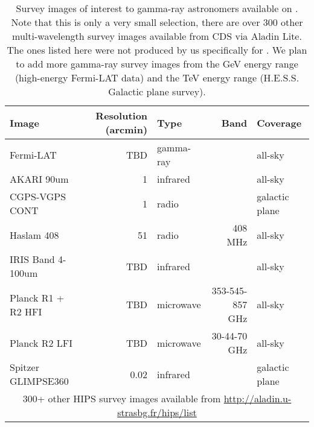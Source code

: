 \begin{table}[bt]

\caption{
Survey images of interest to gamma-ray astronomers available on \gammasky . Note that this is only a very small selection, there are over 300 other multi-wavelength survey images available from CDS via Aladin Lite. The ones listed here were not produced by us specifically for \gammasky . We plan to add more gamma-ray survey images from the GeV energy range (high-energy Fermi-LAT data) and the TeV energy range (H.E.S.S. Galactic plane survey).
}
\label{tab:images}
\begin{tabular}{ lrlrl }
\hline
Image & Resolution (arcmin) & Type & Band & Coverage\\
\hline
Fermi-LAT & TBD & gamma-ray &  & all-sky\\
AKARI 90um & 1 & infrared &  & all-sky\\
CGPS-VGPS CONT & 1 & radio &  & galactic plane\\
Haslam 408 & 51 & radio & 408 MHz & all-sky\\
IRIS Band 4-100um & TBD & infrared &  & all-sky\\
Planck R1 + R2 HFI & TBD & microwave & 353-545-857 GHz & all-sky\\
Planck R2 LFI & TBD & microwave & 30-44-70 GHz & all-sky\\
Spitzer GLIMPSE360 & 0.02 & infrared &  & galactic plane\\
\multicolumn{5}{c}{300+ other HIPS survey images available from \url{http://aladin.u-strasbg.fr/hips/list}} \\
\hline
\end{tabular}

\end{table}
